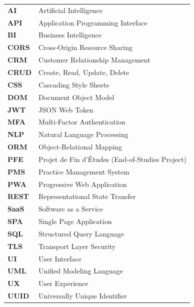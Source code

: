 \documentclass[12pt,a4paper,oneside]{report}
\begin{document}
\begin{tabular}{ll}
\textbf{AI}    & Artificial Intelligence \\
\textbf{API}   & Application Programming Interface \\
\textbf{BI}    & Business Intelligence \\
\textbf{CORS}  & Cross-Origin Resource Sharing \\
\textbf{CRM}   & Customer Relationship Management \\
\textbf{CRUD}  & Create, Read, Update, Delete \\
\textbf{CSS}   & Cascading Style Sheets \\
\textbf{DOM}   & Document Object Model \\
\textbf{JWT}   & JSON Web Token \\
\textbf{MFA}   & Multi-Factor Authentication \\
\textbf{NLP}   & Natural Language Processing \\
\textbf{ORM}   & Object-Relational Mapping \\
\textbf{PFE}   & Projet de Fin d'Études (End-of-Studies Project) \\
\textbf{PMS}   & Practice Management System \\
\textbf{PWA}   & Progressive Web Application \\
\textbf{REST}  & Representational State Transfer \\
\textbf{SaaS}  & Software as a Service \\
\textbf{SPA}   & Single Page Application \\
\textbf{SQL}   & Structured Query Language \\
\textbf{TLS}   & Transport Layer Security \\
\textbf{UI}    & User Interface \\
\textbf{UML}   & Unified Modeling Language \\
\textbf{UX}    & User Experience \\
\textbf{UUID}  & Universally Unique Identifier \\
\end{tabular}

\newpage


\end{document}
